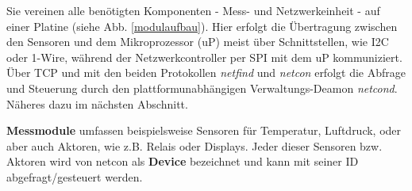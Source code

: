 \documentclass[a4paper,14pt,headsepline]{scrartcl}
\begin{document}
\begin{figure}[h]
\begin{center}
\end{center}
\end{figure}

\newpage

Sie vereinen alle benötigten Komponenten - Mess- und Netzwerkeinheit - auf einer Platine (siehe Abb. \ref{modulaufbau}). Hier erfolgt die Übertragung zwischen den Sensoren und dem Mikroprozessor (uP) meist über Schnittstellen, wie I2C oder 1-Wire, während der Netzwerkcontroller per SPI mit dem uP kommuniziert. Über TCP und mit den beiden Protokollen \textit{netfind} und \textit{netcon} erfolgt die Abfrage und Steuerung durch den plattformunabhängigen Verwaltungs-Deamon \textit{netcond}. Näheres dazu im nächsten Abschnitt. 

\textbf{Messmodule} umfassen beispielsweise Sensoren für Temperatur, Luftdruck, oder aber auch Aktoren, wie z.B. Relais oder Displays. Jeder dieser Sensoren bzw. Aktoren wird von netcon als \textbf{Device} bezeichnet und kann mit seiner ID abgefragt/gesteuert werden.
\end{document}
